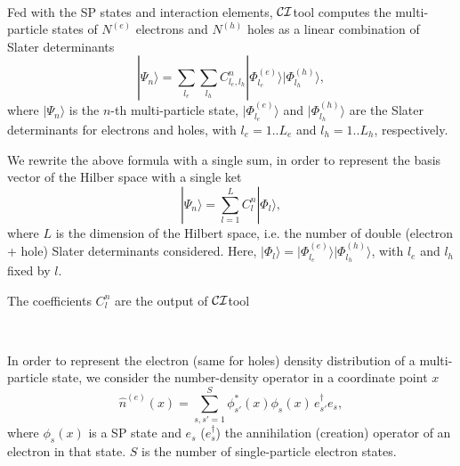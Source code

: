 \documentclass[12pt,twoside]{article}
\newcommand*{\CItool}[0]{{$\cal CI$}\textsf{tool} }
\begin{document}
\

Fed with the SP states and interaction elements, \CItool computes the
multi-particle states of $N^{(e)}$ electrons and $N^{(h)}$ holes as a linear
combination of Slater determinants
\begin{equation} \label{Psi1}
|\Psi_n\rangle = \sum_{l_e}\sum_{l_h} C^n_{l_e,l_h}  |\Phi^{(e)}_{l_e}\rangle
|\Phi^{(h)}_{l_h}\rangle ,
\end{equation}
where $|\Psi_n\rangle$ is the $n$-th multi-particle state, $|\Phi^{(e)}_{l_e}\rangle$
and $|\Phi^{(h)}_{l_h}\rangle$ are the Slater determinants for electrons and
holes, with $l_e= 1..L_e$ and $l_h= 1..L_h$, respectively.

We rewrite the above formula with a single sum, 
in order to represent the basis vector of the Hilber space with a single ket
\begin{equation} \label{Psi2}
|\Psi_n\rangle = \sum_{l=1}^L  C^n_l  |\Phi_l \rangle ,
\end{equation}
where $L$ is the dimension of the Hilbert space, i.e. the number of
double (electron + hole) Slater determinants considered.
Here, $|\Phi_l \rangle = |\Phi^{(e)}_{l_e}\rangle |\Phi^{(h)}_{l_h}\rangle$,
with $l_e$ and $l_h$ fixed by $l$.

The coefficients $C^n_l$ are the output of \CItool

\

In order to represent the electron (same for holes) density
distribution of a multi-particle state, we consider the 
number-density operator in a coordinate point $x$
\begin{equation} \label{numberdensity}
\hat n^{(e)}(x) = 
\sum_{s, s' =1}^S \phi^*_{s'}(x) \phi_{s}(x) \, e^\dagger_{s'} e_{s} ,
\end{equation}
where $\phi_{s}(x)$ is a SP state and
$e_s$ ($e^\dagger_s$) the annihilation (creation) operator
of an electron in that state. $S$ is the number of single-particle
electron states.
\end{document}
